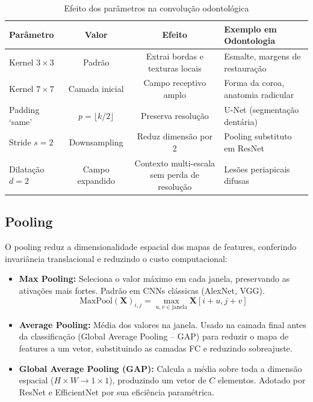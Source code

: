 \begin{table}[H]
  \centering
  \caption{Efeito dos parâmetros na convolução odontológica}
  \label{tab:conv-params}
  \begin{tabularx}{\textwidth}{lccX}
    \toprule
    \textbf{Parâmetro} & \textbf{Valor} & \textbf{Efeito} & \textbf{Exemplo em Odontologia} \\
    \midrule
    Kernel $3 \times 3$ & Padrão & Extrai bordas e texturas locais & Esmalte, margens de restauração \\
    Kernel $7 \times 7$ & Camada inicial & Campo receptivo amplo & Forma da coroa, anatomia radicular \\
    Padding `same' & $p = \lfloor k/2 \rfloor$ & Preserva resolução & U-Net (segmentação dentária) \\
    Stride $s=2$ & Downsampling & Reduz dimensão por 2 & Pooling substituto em ResNet \\
    Dilatação $d=2$ & Campo expandido & Contexto multi-escala sem perda de resolução & Lesões periapicais difusas \\
    \bottomrule
  \end{tabularx}
\end{table}

\subsection{Pooling}

O pooling reduz a dimensionalidade espacial dos mapas de features, conferindo
invariância translacional e reduzindo o custo computacional:

\begin{itemize}
  \item \textbf{Max Pooling:} Seleciona o valor máximo em cada janela, preservando
        as ativações mais fortes. Padrão em CNNs clássicas (AlexNet, VGG).
        \begin{equation}
          \text{MaxPool}(\mathbf{X})_{i,j} = \max_{u,v \in \text{janela}} \mathbf{X}[i+u, j+v]
          \label{eq:maxpool}
        \end{equation}
  \item \textbf{Average Pooling:} Média dos valores na janela. Usado na camada
        final antes da classificação (Global Average Pooling -- GAP) para reduzir
        o mapa de features a um vetor, substituindo as camadas FC e reduzindo
        sobreajuste.
  \item \textbf{Global Average Pooling (GAP):} Calcula a média sobre toda a
        dimensão espacial ($H \times W \to 1 \times 1$), produzindo um vetor de
        $C$ elementos. Adotado por ResNet e EfficientNet por sua eficiência
        paramétrica.
\end{itemize}


